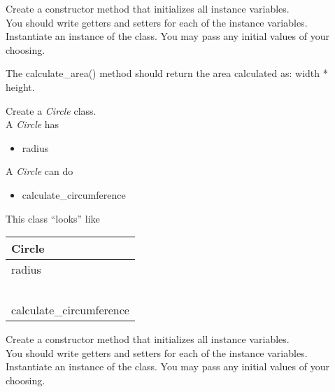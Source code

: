 \documentclass{article}
\newcommand{\tab}{\hspace*{0.25in}}
\begin{document}
\begin{enumerate}
	\vspace*{2ex}
	Create a constructor method that initializes all instance variables.\\
	You should write getters and setters for each of the instance variables.\\
	Instantiate an instance of the class. You may pass any initial values of your choosing.
	
	The calculate\_area() method should return the area calculated as: width * height.\\




	\begin{minipage}{.6\textwidth}
	\item Create a \textit{Circle} class.\\		
		A \textit{Circle} has
		\begin{itemize}
			\item radius 
		\end{itemize}

		A \textit{Circle} can do
		\begin{itemize}
			\item calculate\_circumference
		\end{itemize}
	\end{minipage}
	\begin{minipage}{.4\textwidth}
		This class ``looks'' like 
				
		\vspace*{1em}
		\begin{tabular}{|l|}
			\hline Circle\\ \hline
			radius\\ \ \\  \hline
			calculate\_circumference\\ \hline
		\end{tabular}
	\end{minipage}

	\vspace*{2ex}
	Create a constructor method that initializes all instance variables.\\
	You should write getters and setters for each of the instance variables.\\
	Instantiate an instance of the class. You may pass any initial values of your choosing.	


\end{enumerate}
\end{document}
